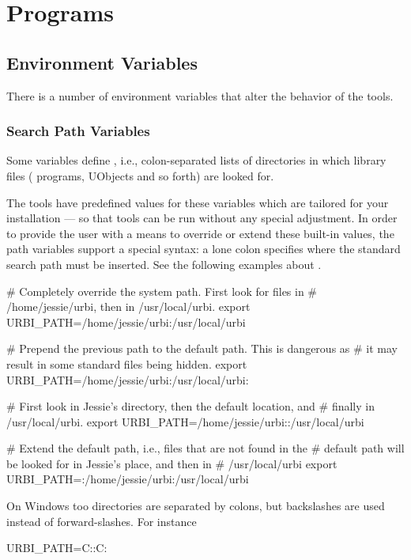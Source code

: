 \chapter{Programs}
\label{sec:tools}

\section{Environment Variables}
\label{sec:tools:envvars}

There is a number of environment variables that alter the behavior of
the \urbi tools.

\subsection{Search Path Variables}

Some variables define , i.e.,
colon-separated lists of directories in which library files (\us
programs, UObjects and so forth) are looked for.

The tools have predefined values for these variables which are
tailored for your installation --- so that \urbi tools can be run
without any special adjustment.  In order to provide the user with a
means to override or extend these built-in values, the path variables
support a special syntax: a lone colon specifies where the standard
search path must be inserted.  See the following examples about
.

\begin{shell}
# Completely override the system path.  First look for files in
# /home/jessie/urbi, then in /usr/local/urbi.
export URBI_PATH=/home/jessie/urbi:/usr/local/urbi

# Prepend the previous path to the default path.  This is dangerous as
# it may result in some standard files being hidden.
export URBI_PATH=/home/jessie/urbi:/usr/local/urbi:

# First look in Jessie's directory, then the default location, and
# finally in /usr/local/urbi.
export URBI_PATH=/home/jessie/urbi::/usr/local/urbi

# Extend the default path, i.e., files that are not found in the
# default path will be looked for in Jessie's place, and then in
# /usr/local/urbi
export URBI_PATH=:/home/jessie/urbi:/usr/local/urbi
\end{shell}

\begin{windows}
  On Windows too directories are separated by colons, but backslashes
  are used instead of forward-slashes.  For instance
\begin{shell}
URBI_PATH=C:\cygwin\home\jessie\urbi:C:\cygwin\usr\local\urbi
\end{shell}
\end{windows}

